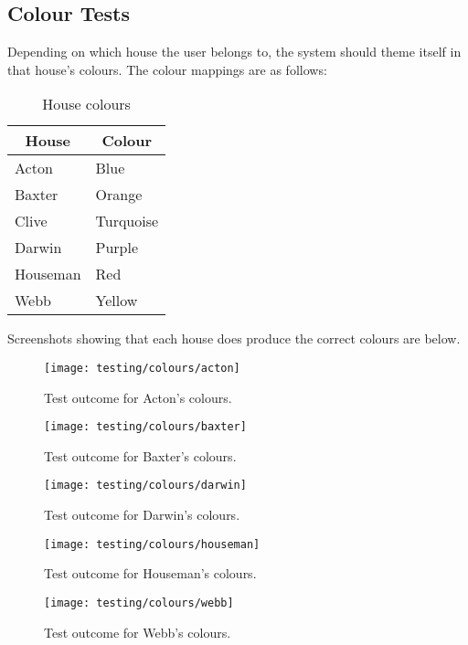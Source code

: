 \subsection{Colour Tests} %
\label{sub:colour_tests}
Depending on which house the user belongs to, the system should theme itself in that house's colours. The colour mappings are as follows:

\begin{table}[!htbp]
\centering
\begin{tabular}{|l|l|}
\hline
\multicolumn{1}{|c|}{\textbf{House}} & \multicolumn{1}{c|}{\textbf{Colour}} \\ \hline
Acton                                & Blue                                  \\ \hline
Baxter                               & Orange                               \\ \hline
Clive                                & Turquoise                            \\ \hline
Darwin                               & Purple                               \\ \hline
Houseman                             & Red                                  \\ \hline
Webb                                 & Yellow                               \\ \hline
\end{tabular}
\caption{House colours}
\end{table}

Screenshots showing that each house does produce the correct colours are below.
\clearpage

\begin{figure}[!htbp]
  \centering
  \texttt{[image: testing/colours/acton]}
  \caption{Test outcome for Acton's colours.}
\end{figure}

\begin{figure}[!htbp]
  \centering
  \texttt{[image: testing/colours/baxter]}
  \caption{Test outcome for Baxter's colours.}
\end{figure}

\begin{figure}[!htbp]
  \centering
  \texttt{[image: testing/colours/darwin]}
  \caption{Test outcome for Darwin's colours.}
\end{figure}

\begin{figure}[!htbp]
  \centering
  \texttt{[image: testing/colours/houseman]}
  \caption{Test outcome for Houseman's colours.}
\end{figure}

\begin{figure}[!htbp]
  \centering
  \texttt{[image: testing/colours/webb]}
  \caption{Test outcome for Webb's colours.}
\end{figure}

